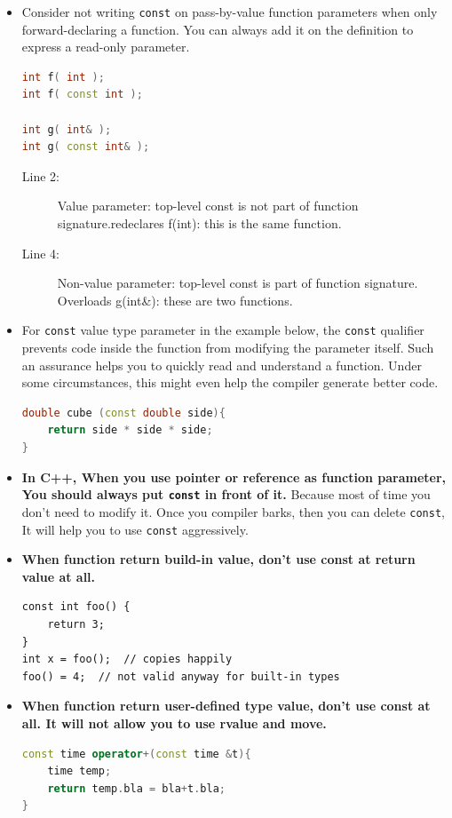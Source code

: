 \documentclass[a4paper,11pt,twoside]{book}
\begin{document}
\begin{itemize}
	\item  Consider not writing \texttt{const} on pass-by-value function parameters when only forward-declaring a function. You can always add it on the definition to express a read-only parameter.
\begin{lstlisting}[frame=single, language=c++]
int f( int );
int f( const int );    

int g( int& );
int g( const int& );   
\end{lstlisting}
\begin{description}
	\item[Line 2:] Value parameter: top-level const is not part of function signature.redeclares f(int): this is the same function.
	
	\item[Line 4:] Non-value parameter: top-level const is part of function signature. Overloads g(int\&): these are two functions.
\end{description}
	
	\item For \texttt{const} value type parameter in the example below, the \texttt{const} qualifier prevents code inside the function from modifying the parameter itself. Such an assurance helps you to quickly read and understand a function. Under some circumstances, this might even help the compiler generate better code. 
\begin{lstlisting}[frame=single, language=c++]
double cube (const double side){
	return side * side * side;
}
\end{lstlisting}
	
	\item \textbf{In C++, When you use pointer or reference as function parameter, You should always put \texttt{const} in front of it.} Because most of time you don't need to modify it.  Once you compiler barks, then you can delete \texttt{const}, It will help you to use \texttt{const} aggressively.
	
	\item \textbf{When function return build-in value, don't use const at return value at all. }
\begin{lstlisting}[numbers=none]
const int foo() {
	return 3;
}
int x = foo();  // copies happily
foo() = 4;  // not valid anyway for built-in types
\end{lstlisting}
	
\item \textbf{When function return user-defined type value, don't use const at all. It will not allow you to use rvalue and move. }
\begin{lstlisting}[frame=single, language=c++]
const time operator+(const time &t){
	time temp;
	return temp.bla = bla+t.bla;
}
	

\end{lstlisting}
\end{itemize}
\end{document}
